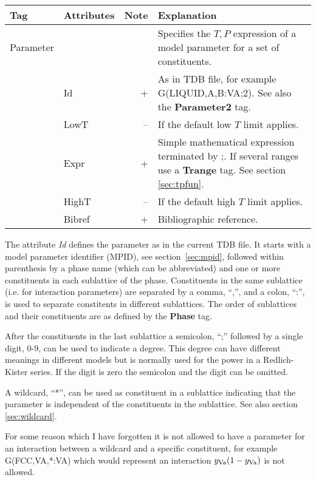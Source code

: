 \documentclass{article}
\begin{document}
\bigskip
\begin{tabular}{|p{} p{} r p{}|}\hline
  Tag & Attributes & Note & Explanation\\\hline

  Parameter & && Specifies the $T, P$ expression of a model parameter for a set of constituents.\\
      & Id & + & As in TDB file, for example G(LIQUID,A,B:VA;2).  See also the {\bf Parameter2} tag. \\
      & LowT & -- & If the default low $T$ limit applies.\\
      & Expr & + & Simple mathematical expression terminated by ;.  If several ranges use a {\bf Trange} tag.  See section \ref{sec:tpfun}.\\
      & HighT & -- & If the default high $T$ limit applies.\\
      & Bibref & + & Bibliographic reference.\\\hline
\end{tabular}

The attribute {\em Id} defines the parameter as in the current TDB
file.  It starts with a model parameter identifier (MPID), see
section~\ref{sec:mpid}, followed within parenthesis by a phase name
(which can be abbreviated) and one or more constituents in each
sublattice of the phase.  Constituents in the same sublattice (i.e.
for interaction parameters) are separated by a comma, ``,'', and a
colon, ``:'', is used to separate constitents in different
sublattices.  The order of sublattices and their constituents are as
defined by the {\bf Phase} tag.

After the constituents in the last sublattice a semicolon, ``;''
followed by a single digit, 0-9, can be used to indicate a degree.
This degree can have different meanings in different models but is
normally used for the power in a Redlich-Kister series.  If the digit
is zero the semicolon and the digit can be omitted.

A wildcard, ``*'', can be used as constituent in a sublattice
indicating that the parameter is independent of the constituents in
the sublattice.  See also section \ref{sec:wildcard}.

For some reason which I have forgotten it is not allowed to have a
parameter for an interaction between a wildcard and a specific
constituent, for example G(FCC,VA,*:VA) which would represent an
interaction $y_{\rm Va}(1-y_{\rm Va})$ is not allowed.


\newpage 
\end{document}

